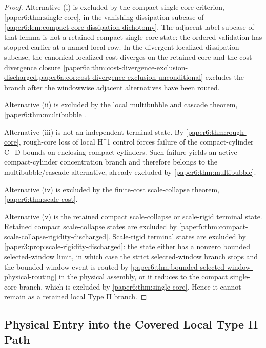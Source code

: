 \documentclass[11pt]{amsart}
\def\({}%
\def\){}%
\theoremstyle{plain}
\theoremstyle{definition}
\theoremstyle{remark}
\begin{document}
\begin{proof}
Alternative \textup{(i)} is excluded by the compact single-core criterion,
\cref{paper6:thm:single-core}, in the vanishing-dissipation subcase of
\cref{paper6:lem:compact-core-dissipation-dichotomy}.  The adjacent-label
subcase of that lemma is not a retained compact single-core state: the ordered
validation has stopped earlier at a named local row.  In the divergent
localized-dissipation subcase, the canonical localized cost diverges on the
retained core and the cost-divergence closure
\cref{paper6a:thm:cost-divergence-exclusion-discharged,paper6a:cor:cost-divergence-exclusion-unconditional}
excludes the branch after the windowwise adjacent alternatives have been
routed.

Alternative \textup{(ii)} is excluded by the local multibubble and cascade
theorem, \cref{paper6:thm:multibubble}.

Alternative \textup{(iii)} is not an independent terminal state.  By
\cref{paper6:thm:rough-core}, rough-core loss of local \(H^1\) control forces
failure of the compact-cylinder \(\mathcal C+\mathcal D\) bounds on enclosing
compact cylinders.  Such failure yields an active compact-cylinder
concentration branch and therefore belongs to the multibubble/cascade
alternative, already excluded by \cref{paper6:thm:multibubble}.

Alternative \textup{(iv)} is excluded by the finite-cost scale-collapse theorem,
\cref{paper6:thm:scale-cost}.

Alternative \textup{(v)} is the retained compact scale-collapse or scale-rigid
terminal state.  Retained compact scale-collapse states are excluded by
\cref{paper5:thm:compact-scale-collapse-rigidity-discharged}.  Scale-rigid
terminal states are excluded by
\cref{paper3:prop:scale-rigidity-discharged}: the state either has a nonzero
bounded selected-window limit, in which case the strict selected-window branch
stops and the bounded-window event is routed by
\cref{paper6:thm:bounded-selected-window-physical-routing} in the physical assembly, or
it reduces to the compact single-core branch, which is excluded by
\cref{paper6:thm:single-core}.  Hence it cannot remain as a retained local Type II
branch.
\end{proof}

\subsection{Physical Entry into the Covered Local Type II Path}
\end{document}
